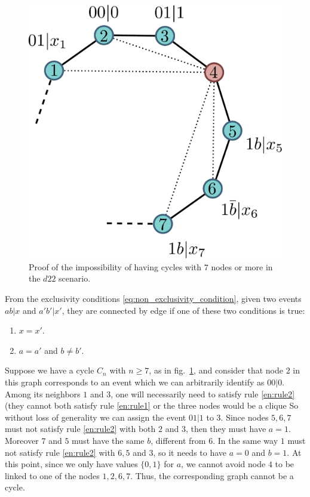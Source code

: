 \documentclass[letterpaper]{article}
\begin{document}
\begin{figure}[h]
    \centering
    \includegraphics[width=.6\columnwidth]{images/cycle_proof.pdf}
    \caption{Proof of the impossibility of having cycles with $7$ nodes or more
    in the $d22$ scenario.}
    \label{fig:cycle_graph_proof}
\end{figure}

From the exclusivity conditions \eqref{eq:non_exclusivity_condition},
given two events $ab|x$ and $a'b'|x'$, they are connected by edge if one of these two conditions is true:
\begin{enumerate}
    \item $x=x'$.\label{en:rule1}
    \item $a=a'$ and $b \neq b'$.\label{en:rule2}
\end{enumerate}
Suppose we have a cycle $C_n$ with $n \ge 7$, as in fig.~\ref{fig:cycle_graph_proof},
and consider that node $2$ in this graph corresponds to an event which we can arbitrarily identify as $00|0$.
Among its neighbors $1$ and $3$, one will necessarily need to satisfy rule
\ref{en:rule2} (they cannot both satisfy rule \ref{en:rule1} or the three nodes
would be a clique 
So without loss of generality we can assign the event $01|1$ to $3$.
Since nodes $5,6,7$ must not satisfy rule \ref{en:rule2} with both $2$ and $3$, then they must have $a = 1$.
Moreover $7$ and $5$ must have the same $b$, different from $6$. In the same way $1$ must not satisfy rule \ref{en:rule2} with $6,5$ and $3$, so it
needs to have $a=0$ and $b=1$. At this point, since we only have values
$\{0,1\}$ for $a$, we cannot avoid node $4$ to be linked to one of the nodes
$1,2,6,7$. Thus, the corresponding graph cannot be a cycle.
\end{document}
